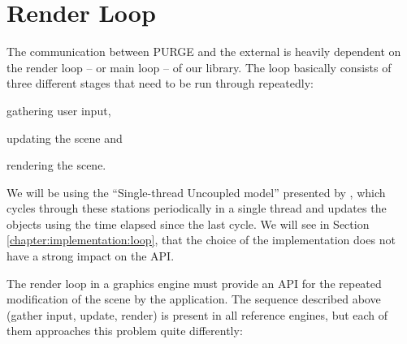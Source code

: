 \section{Render Loop}
\label{chapter:design:loop}

	The communication between PURGE and the external  is heavily dependent on the render loop -- or main loop -- of our library. The loop basically consists of three different stages that need to be run through repeatedly:

	\begin{numlist}
		\item gathering user input,
		\item updating the scene and
		\item rendering the scene.
	\end{numlist}

	We will be using the ``Single-thread Uncoupled model'' presented by \cite{Valente_Conci_Feijo_2005}, which cycles through these stations periodically in a single thread and updates the objects using the time elapsed since the last cycle. We will see in Section \ref{chapter:implementation:loop}, that the choice of the implementation does not have a strong impact on the API.

	The render loop in a graphics engine must provide an API for the repeated modification of the scene by the application. The sequence described above (gather input, update, render) is present in all reference engines, but each of them approaches this problem quite differently:

